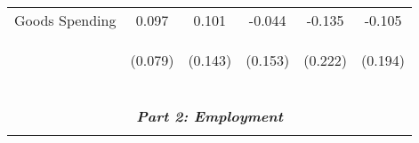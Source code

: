 \begin{tabular}{lccccc}
    Goods Spending & 0.097 & 0.101 & -0.044 & -0.135 & -0.105 \\
     & \begin{footnotesize}(0.079)\end{footnotesize} & \begin{footnotesize}(0.143)\end{footnotesize} & \begin{footnotesize}(0.153)\end{footnotesize} & \begin{footnotesize}(0.222)\end{footnotesize} & \begin{footnotesize}(0.194)\end{footnotesize} \\

     
    \vspace{-2pt} & \vspace{-2pt} & \vspace{-2pt} & \vspace{-2pt} & \vspace{-2pt} \\\hline
    \vspace{-1.5pt} & \vspace{-1.5pt} & \vspace{-1.5pt} & \vspace{-1.5pt} & \vspace{-1.5pt} \\
    \cmidrule{1-6}
    \vspace{-1.5pt} & \vspace{-1.5pt} & \vspace{-1.5pt} & \vspace{-1.5pt} & \vspace{-1.5pt} \\
    \multicolumn{6}{c}{\textit{\textbf{Part 2: Employment}}} \\ 
    \vspace{-1.5pt} & \vspace{-1.5pt} & \vspace{-1.5pt} & \vspace{-1.5pt} & \vspace{-1.5pt} \\ 


\end{tabular}
